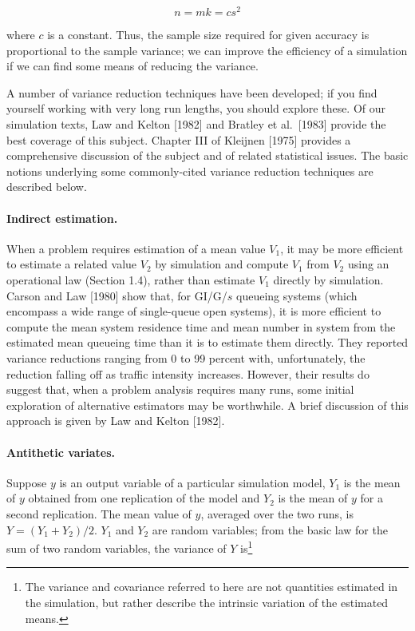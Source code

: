 \begin{equation}
n = mk = c s^2
\label{eq:output-n-variance}
\end{equation}

where $c$ is a constant. Thus, the sample size required for given accuracy is
proportional to the sample variance; we can improve the efficiency of a
simulation if we can find some means of reducing the variance.

A number of variance reduction techniques have been developed; if you find
yourself working with very long run lengths, you should explore these. Of our
simulation texts, Law and Kelton [1982] and Bratley et al.\ [1983] provide the
best coverage of this subject. Chapter III of Kleijnen [1975] provides a
comprehensive discussion of the subject and of related statistical issues. The
basic notions underlying some commonly-cited variance reduction techniques are
described below.

\paragraph{Indirect estimation.}
When a problem requires estimation of a mean value $V_1$, it may be more
efficient to estimate a related value $V_2$ by simulation and compute $V_1$ from
$V_2$ using an operational law (Section 1.4), rather than estimate $V_1$
directly by simulation. Carson and Law [1980] show that, for GI/G/$s$ queueing
systems (which encompass a wide range of single-queue open systems), it is more
efficient to compute the mean system residence time and mean number in system
from the estimated mean queueing time than it is to estimate them directly.
They reported variance reductions ranging from 0 to 99 percent with,
unfortunately, the reduction falling off as traffic intensity increases.
However, their results do suggest that, when a problem analysis requires many
runs, some initial exploration of alternative estimators may be worthwhile. A
brief discussion of this approach is given by Law and Kelton [1982].

\paragraph{Antithetic variates.}
Suppose $y$ is an output variable of a particular simulation model, $Y_1$ is the
mean of $y$ obtained from one replication of the model and $Y_2$ is the mean of
$y$ for a second replication. The mean value of $y$, averaged over the two runs,
is $Y = (Y_1 + Y_2)/2$. $Y_1$ and $Y_2$ are random variables; from the basic law
for the sum of two random variables, the variance of $Y$ is\footnote{The
variance and covariance referred to here are not quantities estimated in the
simulation, but rather describe the intrinsic variation of the estimated means.}


